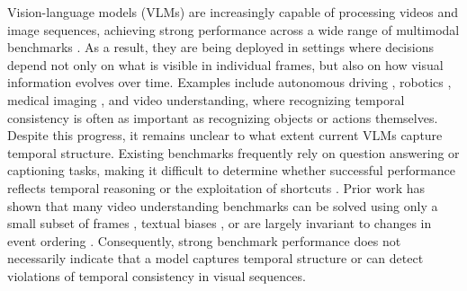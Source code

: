 \documentclass[11pt]{article}
\begin{document}
Vision-language models (VLMs) are increasingly capable of processing videos and image sequences, achieving strong performance across a wide range of multimodal benchmarks \cite{zhang2023video,zhu2024minigpt,zhang2024mm,li2025videochat, bai2025qwen3vltechnicalreport}. As a result, they are being deployed in settings where decisions depend not only on what is visible in individual frames, but also on how visual information evolves over time. Examples include autonomous driving \cite{zhou2024vision}, robotics \cite{kawaharazuka2025vision}, medical imaging \cite{van2024large}, and video understanding, where recognizing temporal consistency is often as important as recognizing objects or actions themselves. Despite this progress, it remains unclear to what extent current VLMs capture temporal structure. Existing benchmarks frequently rely on question answering or captioning tasks, making it difficult to determine whether successful performance reflects temporal reasoning or the exploitation of shortcuts \cite{cores2025losttimenewtemporal,xue2026seeing}. Prior work has shown that many video understanding benchmarks can be solved using only a small subset of frames \cite{buch2022revisiting,lei2023revealing,krojer2025shortcut}, textual biases \cite{goyal2017making}, or are largely invariant to changes in event ordering \cite{cores2025losttimenewtemporal,xue2026seeing}. Consequently, strong benchmark performance does not necessarily indicate that a model captures temporal structure or can detect violations of temporal consistency in visual sequences.
\end{document}
